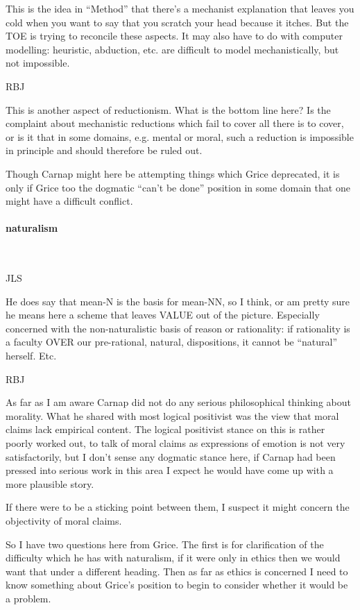 \documentclass[10pt,titlepage]{book}
\begin{document}
This is the idea in ``Method'' that there's a mechanist  
explanation that leaves you cold when you want to say that you scratch your head  
because it itches. But the TOE is trying to reconcile these aspects. It may 
also  have to do with computer modelling: heuristic, abduction, etc. are 
difficult to  model mechanistically, but not impossible.
 
RBJ

This is another aspect of reductionism.
What is the bottom line here?
Is the complaint about mechanistic reductions which fail to cover all there is to cover, or is it that in some domains, e.g. mental or moral, such a reduction is impossible in principle and should therefore be ruled out.

Though Carnap might here be attempting things which Grice deprecated, it is only if Grice too the dogmatic ``can't be done'' position in some domain that one might have a difficult conflict.
 
\paragraph{naturalism}\ 

JLS

He does say that mean-N is the basis for mean-NN, so I think,  
or am pretty sure he means here a scheme that leaves VALUE out of the 
picture.  Especially concerned with the non-naturalistic basis of reason or 
rationality:  if rationality is a faculty OVER our pre-rational, natural, 
dispositions, it  cannot be ``natural'' herself. Etc. 

RBJ

As far as I am aware Carnap did not do any serious philosophical thinking about morality.
What he shared with most logical positivist was the view that moral claims lack empirical content.
The logical positivist stance on this is rather poorly worked out, to talk of moral claims as expressions of emotion is not very satisfactorily, but I don't sense any dogmatic stance here, if Carnap had been pressed into serious work in this area I expect he would have come up with a more plausible story.

If there were to be a sticking point between them, I suspect it might concern the objectivity of moral claims.

So I have two questions here from Grice.
The first is for clarification of the difficulty which he has with naturalism, if it were only in ethics then we would want that under a different heading.
Then as far as ethics is concerned I need to know something about Grice's position to begin to consider whether it would be a problem. 
\end{document}
